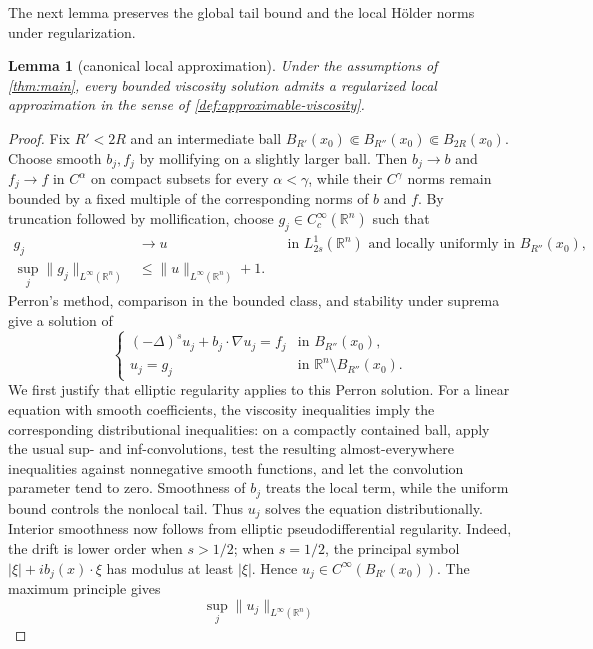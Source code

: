 \documentclass[10pt,a4paper]{amsart}
\numberwithin{equation}{section}
\newtheorem{lemma}[theorem]{Lemma}
\newcommand{\R}{\mathbb R}
\newcommand{\rev}[1]{#1}
\begin{document}
\rev{The next lemma preserves the global tail bound and the local
H\"older norms under regularization.}

\begin{lemma}[canonical local approximation]
\label{lem:canonical-approximation}
Under the assumptions of \cref{thm:main}, every bounded viscosity solution
admits a regularized local approximation in the sense of
\cref{def:approximable-viscosity}.
\end{lemma}

\begin{proof}
\begingroup
Fix $R'<2R$ and an intermediate ball
$B_{R'}(x_0)\Subset B_{R''}(x_0)\Subset B_{2R}(x_0)$.  Choose smooth
$b_j,f_j$ by mollifying on a slightly larger ball.  Then $b_j\to b$ and
$f_j\to f$ in $C^\alpha$ on compact subsets for every $\alpha<\gamma$,
while their $C^\gamma$ norms remain bounded by a fixed multiple of the
corresponding norms of $b$ and $f$.  By truncation followed by
mollification, choose $g_j\in C_c^\infty(\R^n)$
such that
\[
 \begin{aligned}
 g_j&\to u &&\text{in }L^1_{2s}(\R^n)\text{ and locally uniformly in }
 B_{R''}(x_0),\\
 \sup_j\|g_j\|_{L^\infty(\R^n)}&\le
 \|u\|_{L^\infty(\R^n)}+1.
 \end{aligned}
\]
Perron's method, comparison in the bounded class, and stability under
suprema \cite[Theorem~2]{BarlesImbert2008} give a solution of
\[
 \begin{cases}
 (-\Delta)^su_j+b_j\cdot\nabla u_j=f_j&\text{in }B_{R''}(x_0),\\
 u_j=g_j&\text{in }\R^n\setminus B_{R''}(x_0).
 \end{cases}
\]
We first justify that elliptic regularity applies to this Perron solution.
For a linear equation with smooth coefficients, the viscosity inequalities
imply the corresponding distributional inequalities: on a compactly
contained ball, apply the usual sup- and inf-convolutions, test the resulting
almost-everywhere inequalities against nonnegative smooth functions, and let
the convolution parameter tend to zero.  Smoothness of $b_j$ treats the local
term, while the uniform bound controls the nonlocal tail.  Thus $u_j$ solves
the equation distributionally.  Interior smoothness now follows from
elliptic pseudodifferential regularity.  Indeed, the drift is lower order when
$s>1/2$; when $s=1/2$, the principal symbol
$|\xi|+i b_j(x)\cdot\xi$ has modulus at least $|\xi|$.  Hence
$u_j\in C^\infty(B_{R'}(x_0))$.  The maximum principle gives
\[
 \sup_j\|u_j\|_{L^\infty(\R^n)}
\]
\end{proof}
\end{document}
